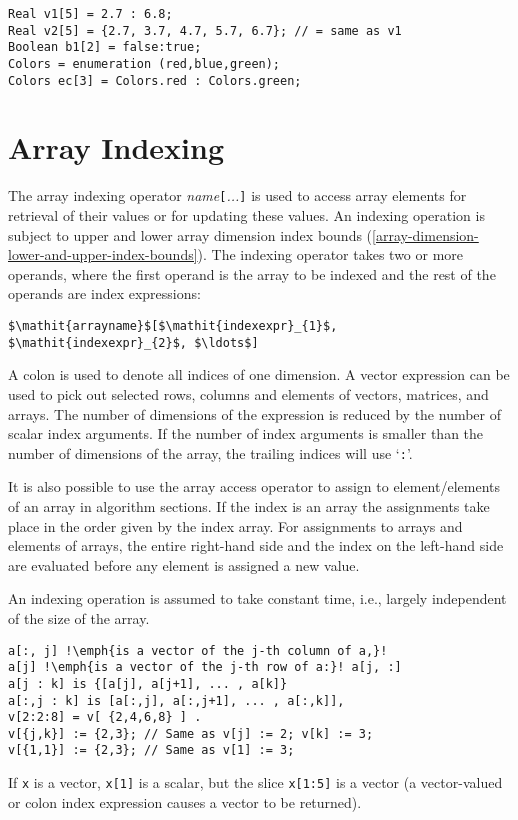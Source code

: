 \begin{example}
\begin{lstlisting}[language=modelica]
Real v1[5] = 2.7 : 6.8;
Real v2[5] = {2.7, 3.7, 4.7, 5.7, 6.7}; // = same as v1
Boolean b1[2] = false:true;
Colors = enumeration (red,blue,green);
Colors ec[3] = Colors.red : Colors.green;
\end{lstlisting}
\end{example}

\section{Array Indexing}

The array indexing operator \emph{name}\lstinline![!\emph{...}\lstinline!]! is used to
access array elements for retrieval of their values or for updating
these values. An indexing operation is subject to upper and lower array
dimension index bounds (\autoref{array-dimension-lower-and-upper-index-bounds}).  The indexing operator takes two or more
operands, where the first operand is the array to be indexed and the rest of the operands are index expressions:

\lstinline!$\mathit{arrayname}$[$\mathit{indexexpr}_{1}$, $\mathit{indexexpr}_{2}$, $\ldots$]!

A colon is used to denote all indices of one dimension. A vector
expression can be used to pick out selected rows, columns and elements
of vectors, matrices, and arrays. The number of dimensions of the
expression is reduced by the number of scalar index arguments. If the
number of index arguments is smaller than the number of dimensions of
the array, the trailing indices will use `\lstinline!:!'.

It is also possible to use the array access operator to assign to
element/elements of an array in algorithm sections. If the index is an
array the assignments take place in the order given by the index array.
For assignments to arrays and elements of arrays, the entire right-hand
side and the index on the left-hand side are evaluated before any
element is assigned a new value.

\begin{nonnormative}
An indexing operation is assumed to take constant time, i.e., largely independent of the size of the array.
\end{nonnormative}

\begin{example}
\begin{lstlisting}[language=modelica, escapechar=!]
a[:, j] !\emph{is a vector of the j-th column of a,}!
a[j] !\emph{is a vector of the j-th row of a:}! a[j, :]
a[j : k] is {[a[j], a[j+1], ... , a[k]}
a[:,j : k] is [a[:,j], a[:,j+1], ... , a[:,k]],
v[2:2:8] = v[ {2,4,6,8} ] .
v[{j,k}] := {2,3}; // Same as v[j] := 2; v[k] := 3;
v[{1,1}] := {2,3}; // Same as v[1] := 3;
\end{lstlisting}
If \lstinline!x! is a vector, \lstinline!x[1]! is a scalar, but the slice \lstinline!x[1:5]! is a vector
(a vector-valued or colon index expression causes a vector to be returned).
\end{example}

